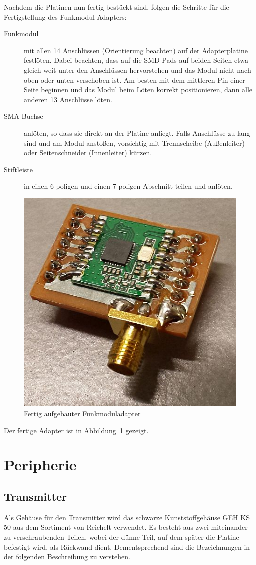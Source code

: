\documentclass[paper=a4, parskip, numbers=noenddot, toc=listof, headsepline]{scrbook}
\begin{document}
			Nachdem die Platinen nun fertig bestückt sind, folgen die Schritte für die Fertigstellung des Funkmodul-Adapters:
			\begin{description}
				\item[Funkmodul] mit allen 14 Anschlüssen (Orientierung beachten) auf der Adapterplatine festlöten. Dabei beachten, dass auf die SMD-Pads auf beiden Seiten etwa gleich weit unter den Anschlüssen hervorstehen und das Modul nicht nach oben oder unten verschoben ist. Am besten mit dem mittleren Pin einer Seite beginnen und das Modul beim Löten korrekt positionieren, dann alle anderen 13 Anschlüsse löten.
				\item[SMA-Buchse] anlöten, so dass sie direkt an der Platine anliegt. Falls Anschlüsse zu lang sind und am Modul anstoßen, vorsichtig mit Trennscheibe (Außenleiter) oder Seitenschneider (Innenleiter) kürzen.
				\item[Stiftleiste] in einen 6-poligen und einen 7-poligen Abschnitt teilen und anlöten.
			\end{description}

			\begin{figure}
				\centering
				\includegraphics[width=.5\textwidth]{bilder/funkmoduladapter}
				\caption{Fertig aufgebauter Funkmoduladapter}
				\label{fig:funkmoduladapter}
			\end{figure}

			Der fertige Adapter ist in Abbildung~\ref{fig:funkmoduladapter} gezeigt.

		\section{Peripherie}

			\subsection{Transmitter}
				Als Gehäuse für den Transmitter wird das schwarze Kunststoffgehäuse GEH KS 50 aus dem Sortiment von Reichelt verwendet. Es besteht aus zwei miteinander zu verschraubenden Teilen, wobei der dünne Teil, auf dem später die Platine befestigt wird, als Rückwand dient. Dementsprechend sind die Bezeichnungen in der folgenden Beschreibung zu verstehen.
\end{document}
